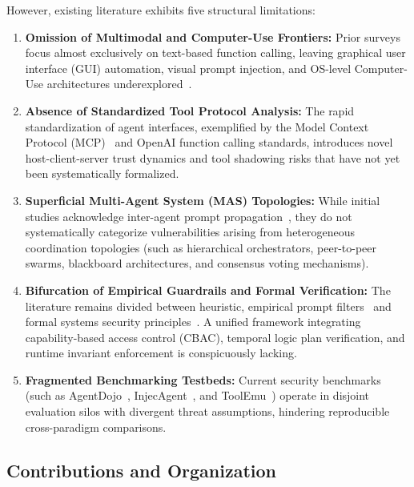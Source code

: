 However, existing literature exhibits five structural limitations:
\begin{enumerate}
    \item \textbf{Omission of Multimodal and Computer-Use Frontiers:} Prior surveys focus almost exclusively on text-based function calling, leaving graphical user interface (GUI) automation, visual prompt injection, and OS-level Computer-Use architectures underexplored~\cite{gu2024agent, xie2024osworld}.
    \item \textbf{Absence of Standardized Tool Protocol Analysis:} The rapid standardization of agent interfaces, exemplified by the Model Context Protocol (MCP)~\cite{hou2026mcp} and OpenAI function calling standards, introduces novel host-client-server trust dynamics and tool shadowing risks that have not yet been systematically formalized.
    \item \textbf{Superficial Multi-Agent System (MAS) Topologies:} While initial studies acknowledge inter-agent prompt propagation~\cite{gu2024agent, dewitt2025open}, they do not systematically categorize vulnerabilities arising from heterogeneous coordination topologies (such as hierarchical orchestrators, peer-to-peer swarms, blackboard architectures, and consensus voting mechanisms).
    \item \textbf{Bifurcation of Empirical Guardrails and Formal Verification:} The literature remains divided between heuristic, empirical prompt filters~\cite{inan2023llama, zeng2024shieldgemma} and formal systems security principles~\cite{chen2025struq}. A unified framework integrating capability-based access control (CBAC), temporal logic plan verification, and runtime invariant enforcement is conspicuously lacking.
    \item \textbf{Fragmented Benchmarking Testbeds:} Current security benchmarks (such as AgentDojo~\cite{debenedetti2024agentdojo}, InjecAgent~\cite{zhan2024injecagent}, and ToolEmu~\cite{ruan2023identifying}) operate in disjoint evaluation silos with divergent threat assumptions, hindering reproducible cross-paradigm comparisons.
\end{enumerate}

\subsection{Contributions and Organization}
\label{subsec:contributions}

